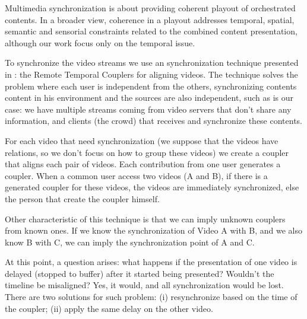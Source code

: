 Multimedia synchronization is about providing coherent playout of orchestrated contents. In a broader view, coherence in a playout addresses temporal, spatial, semantic and sensorial constraints related to the combined content presentation, although our work focus only on the temporal issue.

To synchronize the video streams we use an synchronization technique presented in \cite{segundo2015remote}: the Remote Temporal Couplers for aligning videos. The technique solves the problem where each user is independent from the others, synchronizing contents content in his environment and the sources are also independent, such as is our case: we have multiple streams coming from video servers that don't share any information, and clients (the crowd) that receives and synchronize these contents.

For each video that need synchronization (we suppose that the videos have relations, so we don't focus on how to group these videos) we create a coupler that aligns each pair of videos. Each contribution from one user generates a coupler. When a common user access two videos (A and B), if there is a generated coupler for these videos, the videos are immediately synchronized, else the person that create the coupler himself.

Other characteristic of this technique is that we can imply unknown couplers from known ones. If we know the synchronization of Video A with B, and we also know B with C, we can imply the synchronization point of A and C.

At this point, a question arises: what happens if the presentation of one video is delayed (stopped to buffer) after it started being presented? Wouldn’t the timeline be misaligned? Yes, it would, and all synchronization would be lost. There are two solutions for such problem: (i) resynchronize based on the time of the coupler; (ii) apply the same delay on the other video.